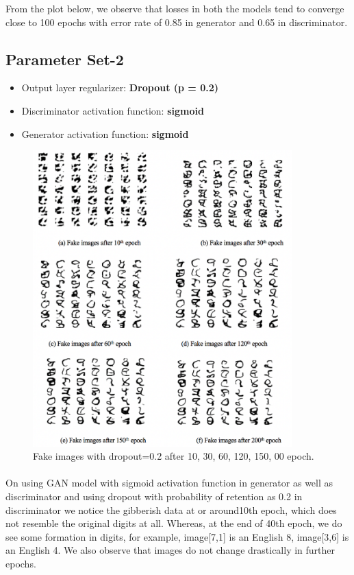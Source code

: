 \documentclass{article}
\begin{document}
From the plot below, we observe that losses in both the models tend to converge close to 100 epochs with error rate of 0.85 in generator and 0.65 in discriminator.

\subsection{Parameter Set-2}
\begin{itemize}
	\item Output layer regularizer: \textbf{Dropout (p = 0.2)}
	\item Discriminator activation function:  \textbf{sigmoid}
	\item Generator activation function:  \textbf{sigmoid}
\end{itemize}


\begin{figure}[H]
	\centering
	\includegraphics[width=10cm]{figs/Picture6}
	\caption{Fake images with dropout=0.2 after 10, 30, 60, 120, 150, 00 epoch.}
\end{figure}

\paragraph{}
On using GAN model with sigmoid activation function in generator as well as discriminator and using dropout with probability of retention as 0.2 in discriminator we notice the gibberish data at or around10th  epoch, which does not resemble the original digits at all. Whereas, at the end of 40th epoch, we do see some formation in digits, for example, image[7,1] is an English 8, image[3,6] is an English 4. We also observe that images do not change drastically in further epochs. 
\end{document}
